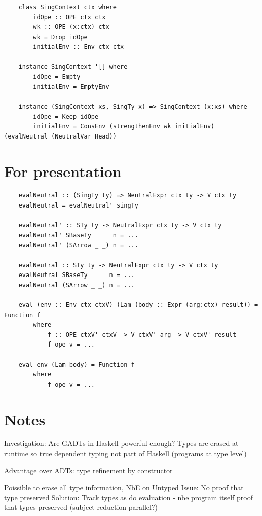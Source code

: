 \begin{lstlisting}
    class SingContext ctx where
        idOpe :: OPE ctx ctx
        wk :: OPE (x:ctx) ctx
        wk = Drop idOpe
        initialEnv :: Env ctx ctx

    instance SingContext '[] where
        idOpe = Empty
        initialEnv = EmptyEnv

    instance (SingContext xs, SingTy x) => SingContext (x:xs) where
        idOpe = Keep idOpe
        initialEnv = ConsEnv (strengthenEnv wk initialEnv) (evalNeutral (NeutralVar Head))
\end{lstlisting}

\section{For presentation}

\begin{lstlisting}
    evalNeutral :: (SingTy ty) => NeutralExpr ctx ty -> V ctx ty
    evalNeutral = evalNeutral' singTy

    evalNeutral' :: STy ty -> NeutralExpr ctx ty -> V ctx ty
    evalNeutral' SBaseTy      n = ...
    evalNeutral' (SArrow _ _) n = ...

    evalNeutral :: STy ty -> NeutralExpr ctx ty -> V ctx ty
    evalNeutral SBaseTy      n = ...
    evalNeutral (SArrow _ _) n = ...

    eval (env :: Env ctx ctxV) (Lam (body :: Expr (arg:ctx) result)) = Function f 
        where
            f :: OPE ctxV' ctxV -> V ctxV' arg -> V ctxV' result
            f ope v = ...

    eval env (Lam body) = Function f 
        where
            f ope v = ...
\end{lstlisting}

\section{Notes}

Investigation: Are GADTs in Haskell powerful enough? Types are erased at runtime so true dependent typing not part of Haskell (programs at type level)

Advantage over ADTs: type refinement by constructor

Poissible to erase all type information, NbE on Untyped
Issue: No proof that type preserved 
Solution: Track types as do evaluation - nbe program itself proof that types preserved (subject reduction parallel?)

